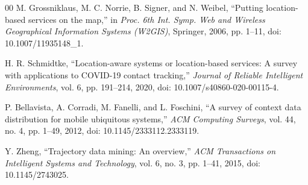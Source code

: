 \documentclass[conference]{IEEEtran}
\begin{document}
\begin{thebibliography}{00}
M. Grossniklaus, M. C. Norrie, B. Signer, and N. Weibel, ``Putting location-based services on the map,'' in \textit{Proc. 6th Int. Symp. Web and Wireless Geographical Information Systems (W2GIS)}, Springer, 2006, pp. 1--11, doi: 10.1007/11935148\_1.

H. R. Schmidtke, ``Location-aware systems or location-based services: A survey with applications to COVID-19 contact tracking,'' \textit{Journal of Reliable Intelligent Environments}, vol. 6, pp. 191--214, 2020, doi: 10.1007/s40860-020-00115-4.

P. Bellavista, A. Corradi, M. Fanelli, and L. Foschini, ``A survey of context data distribution for mobile ubiquitous systems,'' \textit{ACM Computing Surveys}, vol. 44, no. 4, pp. 1--49, 2012, doi: 10.1145/2333112.2333119.

Y. Zheng, ``Trajectory data mining: An overview,'' \textit{ACM Transactions on Intelligent Systems and Technology}, vol. 6, no. 3, pp. 1--41, 2015, doi: 10.1145/2743025.

\end{thebibliography}
\end{document}
